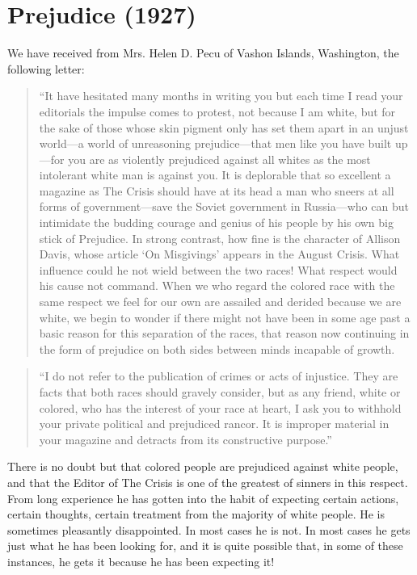 \documentclass[letterpaper,10pt,english]{jupyterBook}
\begin{document}
\section{Prejudice (1927)}
\label{\detokenize{Volumes/34/09/prejudice:prejudice-1927}}\label{\detokenize{Volumes/34/09/prejudice::doc}}
\sphinxAtStartPar
We have received from Mrs. Helen D. Pecu of Vashon Islands, Washington, the following letter:
\begin{quote}

\sphinxAtStartPar
“It have hesitated many months in writing you but each time I read your editorials the impulse comes to protest, not because I am white, but for the sake of those whose skin pigment only has set them apart in an unjust world—a world of unreasoning prejudice—that men like you have built up —for you are as violently prejudiced against all whites as the most intolerant white man is against you. It is deplorable that so excellent a magazine as The Crisis  should have at its head a man who sneers at all forms of government—save the Soviet government in Russia—who can but intimidate the budding courage and genius of his people by his own big stick of Prejudice. In strong contrast, how fine is the character of Allison Davis, whose article ‘On Misgivings’ appears in the August Crisis. What influence could he not wield between the two races! What respect would his cause not command. When we who regard the colored race with the same respect we feel for our own are assailed and derided because we are white, we begin to wonder if there might not have been in some age past a basic reason for this separation of the races, that reason now continuing in the form of prejudice on both sides between minds incapable of growth.
\end{quote}
\begin{quote}

\sphinxAtStartPar
“I do not refer to the publication of crimes or acts of injustice. They are facts that both races should gravely consider, but as any friend, white or colored, who has the interest of your race at heart, I ask you to withhold your private political and prejudiced rancor. It is improper material in your magazine and detracts from its constructive purpose.”
\end{quote}

\sphinxAtStartPar
There is no doubt but that colored people are prejudiced against white people, and that the Editor of The Crisis is one of the greatest of sinners in this respect. From long experience he has gotten into the habit of expecting certain actions, certain thoughts, certain treatment from the majority of white people. He is sometimes pleasantly disappointed. In most cases he is not. In most cases he gets just what he has been looking for, and it is quite possible that, in some of these instances, he gets it because he has been expecting it!
\end{document}
